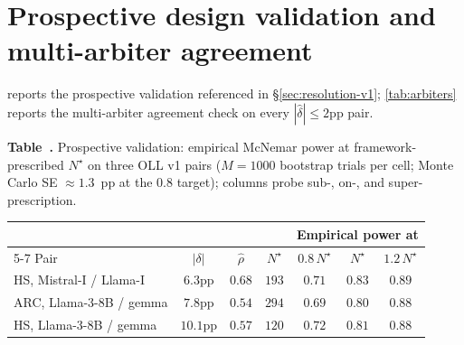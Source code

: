 \documentclass{article}
\theoremstyle{plain}
\theoremstyle{definition}
\begin{document}
\section{Prospective design validation and multi-arbiter agreement}
\label{app:prospective_multiarbiter}

 reports the prospective validation referenced in \S\ref{sec:resolution-v1}; \cref{tab:arbiters} reports the multi-arbiter agreement check on every $|\hat\delta| \leq 2$pp pair.

\label{tab:prospective}%
\begin{center}\footnotesize\vspace{-1ex}
\textbf{Table~\thetable.} Prospective validation: empirical McNemar power at framework-prescribed $N^{\star}$ on three OLL v1 pairs ($M{=}1000$ bootstrap trials per cell; Monte Carlo SE ${\approx}1.3$~pp at the $0.8$ target); columns probe sub-, on-, and super-prescription.\\[3pt]
\setlength{\tabcolsep}{4pt}
\begin{tabular}{@{}lcccccc@{}}
\toprule
 & & & & \multicolumn{3}{c}{Empirical power at} \\
\cmidrule(lr){5-7}
Pair & $|\delta|$ & $\hat\rho$ & $N^{\star}$ & $0.8\,N^{\star}$ & $N^{\star}$ & $1.2\,N^{\star}$ \\
\midrule
HS, Mistral-I / Llama-I  & $6.3$pp & $0.68$ & $193$ & $0.71$ & $\mathbf{0.83}$ & $0.89$ \\
ARC, Llama-3-8B / gemma  & $7.8$pp & $0.54$ & $294$ & $0.69$ & $\mathbf{0.80}$ & $0.88$ \\
HS, Llama-3-8B / gemma   & $10.1$pp & $0.57$ & $120$ & $0.72$ & $\mathbf{0.81}$ & $0.88$ \\
\bottomrule
\end{tabular}
\end{center}
\end{document}
